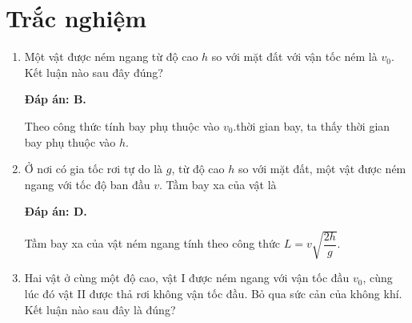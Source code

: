 \section{Trắc nghiệm}
\begin{enumerate}[label=\bfseries Câu \arabic*:]
	
	\item {}
	
	
	{Một vật được ném ngang từ độ cao $h$ so với mặt đất với vận tốc ném là $v_0$. Kết luận nào sau đây đúng?
	}
	
	\hideall
	{	\textbf{Đáp án: B.}
		
		Theo công thức tính bay phụ thuộc vào $v_0$.thời gian bay, ta thấy thời gian bay phụ thuộc vào $h$.
	}
	
	\item {}
	
	
	{Ở nơi có gia tốc rơi tự do là $g$, từ độ cao $h$ so với mặt đất, một vật được ném ngang với tốc độ ban đầu $v$. Tầm bay xa của vật là
	}
	
	\hideall
	{	\textbf{Đáp án: D.}
		
		Tầm bay xa của vật ném ngang tính theo công thức $L=v\sqrt{\dfrac{2h}{g}}$.
	}
	\item {}
	
	
	{Hai vật ở cùng một độ cao, vật I được ném ngang với vận tốc đầu $v_0$, cùng lúc đó vật II được thả rơi không vận tốc đầu. Bỏ qua sức cản của không khí. Kết luận nào sau đây là đúng?
	}
	

\end{enumerate}
